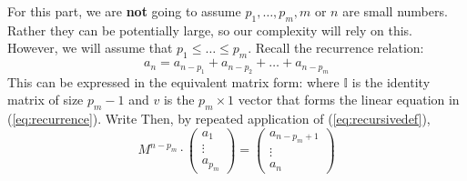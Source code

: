 \documentclass[11pt]{article}
\theoremstyle{plain}
\theoremstyle{definition}
\numberwithin{equation}{section}
\numberwithin{figure}{section}
\begin{document}
\noindent For this part, we are \textbf{not} going to assume $p_1, \ldots, p_m, m$ or $n$ are small numbers. Rather they can be potentially large, so our complexity will rely on this. However, we will assume that $p_1 \leq \ldots \leq p_m$. Recall the recurrence relation:
\begin{equation}
a_n = a_{n - p_1} + a_{n - p_2} + \ldots + a_{n - p_m} \label{eq:recurrence}
\end{equation}
This can be expressed in the equivalent matrix form:
where $\mathbb{I}$ is the identity matrix of size $p_m - 1$ and $v$ is the $p_m \times 1$ vector that forms the linear equation in (\ref{eq:recurrence}). Write 
Then, by repeated application of (\ref{eq:recursivedef}),
\begin{equation}
M^{n - p_m} \cdot \begin{pmatrix} a_{1} \\ \vdots \\ a_{p_m} \end{pmatrix} = \begin{pmatrix} a_{n - p_m + 1} \\ \vdots \\ a_{n} \end{pmatrix}
\end{equation}
\end{document}
